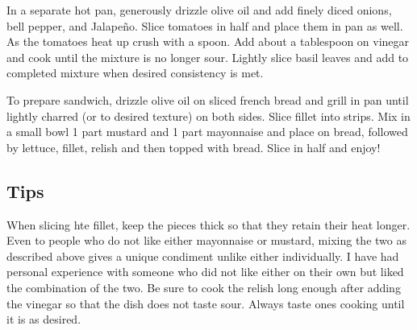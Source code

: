 In a separate hot pan, generously drizzle olive oil and add finely diced onions, bell pepper, and Jalape\~{n}o. Slice tomatoes in half and place them in pan as well. As the tomatoes heat up crush with a spoon. Add about a tablespoon on vinegar and cook until the mixture is no longer sour. Lightly slice basil leaves and add to completed mixture when desired consistency is met. 

To prepare sandwich, drizzle olive oil on sliced french bread and grill in pan until lightly charred (or to desired texture) on both sides. Slice fillet into strips. Mix in a small bowl 1 part mustard and 1 part mayonnaise and place on bread, followed by lettuce, fillet, relish and then topped with bread. Slice in half and enjoy!

\subsection*{Tips}
When slicing hte fillet, keep the pieces thick so that they retain their heat longer. Even to people who do not like either mayonnaise or mustard, mixing the two as described above gives a unique condiment unlike either individually. I have had personal experience with someone who did not like either on their own but liked the combination of the two. Be sure to cook the relish long enough after adding the vinegar so that the dish does not taste sour. Always taste ones cooking until it is as desired.